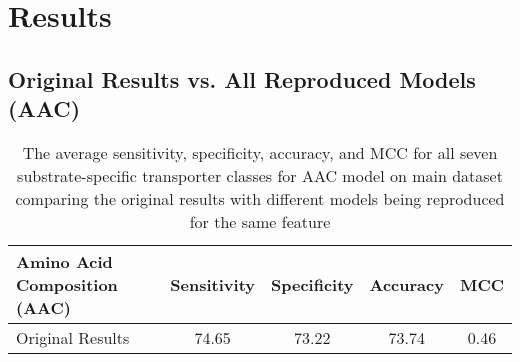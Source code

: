 \section {Results}
\subsection{Original Results vs. All Reproduced Models (AAC)}
\begin{table}[ht]
    \centering
    \begin{tabular}{|L || C C C C |}
        \hline
        Amino Acid Composition (AAC) &
        Sensitivity  &  Specificity  &  Accuracy  &  MCC
        \\
        \hline \hline
         Original Results & 74.65 & 73.22 & 73.74 & 0.46 \\
        \hline

    \end{tabular}
    \captionsetup{font=small,width=12cm}
    \caption{The average sensitivity, specificity, accuracy, and MCC for all seven 
    substrate-specific transporter classes for AAC model on main dataset comparing 
    the original results with different models being reproduced for the same feature}
    \label{tab:table1}
    
\end{table}

